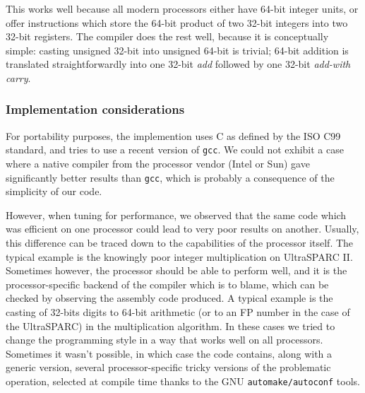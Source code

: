 This works well because all modern processors either have 64-bit
integer units, or offer instructions which store the 64-bit product of
two 32-bit integers into two 32-bit registers. The compiler does the
rest well, because it is conceptually simple: casting unsigned 32-bit
into unsigned 64-bit is trivial; 64-bit addition is translated
straightforwardly into one 32-bit \emph{add} followed by one 32-bit
\emph{add-with carry}.




\subsubsection{Implementation considerations}

For portability purposes, the implemention uses C as defined by
the ISO C99 standard, and tries to use a recent version of \texttt{gcc}.
We could not exhibit a case where a native compiler from the processor
vendor (Intel or Sun) gave significantly better results than
\texttt{gcc}, which is probably a consequence of the simplicity of our
code.

However, when tuning for performance, we observed that the same code
which was efficient on one processor could lead to very poor results
on another.  Usually, this difference can be traced down to the
capabilities of the processor itself. The typical example is the
knowingly poor integer multiplication on UltraSPARC II. Sometimes
however, the processor should be able to perform well, and it is the
processor-specific backend of the compiler which is to blame, which
can be checked by observing the assembly code produced.  A typical
example is the casting of 32-bits digits to 64-bit arithmetic (or to
an FP number in the case of the UltraSPARC) in the multiplication
algorithm. In these cases we tried to change the programming style in
a way that works well on all processors. Sometimes it wasn't possible,
in which case the code contains, along with a generic version, several
processor-specific tricky versions of the problematic operation,
selected at compile time thanks to the GNU \texttt{automake/autoconf}
tools.


